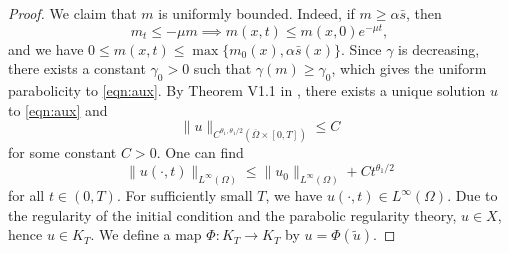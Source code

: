 \documentclass{article}
\begin{document}
\begin{proof}
        We claim that $m$ is uniformly bounded. Indeed, if $m\ge \alpha \bar s$, then
        \begin{equation*}
            m_t \le -\mu m\implies m(x,t)\le m(x,0)e^{-\mu t},
        \end{equation*} 
        and we have $0\le m(x,t) \le \max\{m_0(x),\alpha \bar s(x)\}.$ Since $\gamma$ is decreasing, there exists a constant $\gamma_0>0$ such that $\gamma(m)\ge \gamma_0$, which gives the uniform parabolicity to \eqref{eqn:aux}. 
        By Theorem V1.1 in \cite{Ladyzhenskaya1968}, there exists a unique solution $u$ to \eqref{eqn:aux} and 
        \begin{equation*}
            \|u\|_{C^{\theta_1,\theta_1/2}(\overline{\Omega}\times[0,T])}\le C
        \end{equation*} for some constant $C>0$. One can find
        \begin{equation*}
            \|u(\cdot,t)\|_{L^{\infty}(\Omega)}\le \|u_0\|_{L^{\infty}(\Omega)}+Ct^{\theta_1/2} 
        \end{equation*} for all $t\in (0,T)$.
        For sufficiently small $T$, we have $u(\cdot,t)\in L^\infty(\Omega)$. Due to the regularity of the initial condition and the parabolic regularity theory, $u\in X$, hence $u\in K_T$. We define a map $\Phi:K_T \to K_T$ by $u=\Phi(\tilde u)$.


\end{proof}
\end{document}
